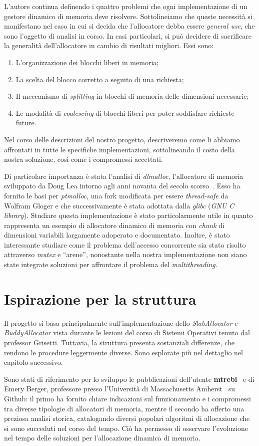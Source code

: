 L’autore continua definendo i quattro problemi che ogni implementazione di un gestore dinamico di memoria deve risolvere. Sottolineiamo che queste necessità si manifestano nel caso in cui si decida che l’allocatore debba essere \textit{general use}, che sono l’oggetto di analisi in corso. In casi particolari, si può decidere di sacrificare la generalità dell’allocatore in cambio di risultati migliori. Essi sono:
\begin{enumerate}
  \item L’organizzazione dei blocchi liberi in memoria;
  \item La scelta del blocco corretto a seguito di una richiesta;
  \item Il meccanismo di \textit{splitting} in blocchi di memoria delle dimensioni necessarie;
  \item Le modalità di \textit{coalescing} di blocchi liberi per poter soddisfare richieste future.
\end{enumerate}
Nel corso delle descrizioni del nostro progetto, descriveremo come li abbiamo affrontati in tutte le specifiche implementazioni, sottolineando il costo della nostra soluzione, così come i compromessi accettati.

Di particolare importanza è stata l’analisi di \textit{dlmalloc}, l’allocatore di memoria sviluppato da Doug Lea intorno agli anni novanta del secolo scorso~\cite{dlmalloc}. Esso ha fornito le basi per \textit{ptmalloc}, una fork modificata per essere \textit{thread-safe} da Wolfram Gloger e che successivamente è stata adottata dalla \textit{glibc} (\textit{GNU C library}). Studiare questa implementazione è stato particolarmente utile in quanto rappresenta un esempio di allocatore dinamico di memoria con \textit{chunk} di dimensioni variabili largamente adoperato e documentato. Inoltre, è stato interessante studiare come il problema dell’accesso concorrente sia stato risolto attraverso \textit{mutex} e ``arene'', nonostante nella nostra implementazione non siano state integrate soluzioni per affrontare il problema del \textit{multithreading}.

\section{Ispirazione per la struttura}
Il progetto si basa principalmente sull’implementazione dello \textit{SlabAllocator} e \textit{BuddyAllocator} vista durante le lezioni del corso di Sistemi Operativi tenuto dal professor Grisetti. Tuttavia, la struttura presenta sostanziali differenze, che rendono le procedure leggermente diverse. Sono esplorate più nel dettaglio nel capitolo successivo.

Sono stati di riferimento per lo sviluppo le pubblicazioni dell’utente \textbf{mtrebi}~\cite{mtrebi} e di Emery Berger, professore presso l’Università di Massachusetts Amherst~\cite{emeryberger} su Github: il primo ha fornito chiare indicazioni sul funzionamento e i compromessi tra diverse tipologie di allocatori di memoria, mentre il secondo ha offerto una preziosa analisi storica, catalogando diversi popolari algoritmi di allocazione che si sono succeduti nel corso del tempo. Ciò ha permesso di osservare l’evoluzione nel tempo delle soluzioni per l’allocazione dinamica di memoria.